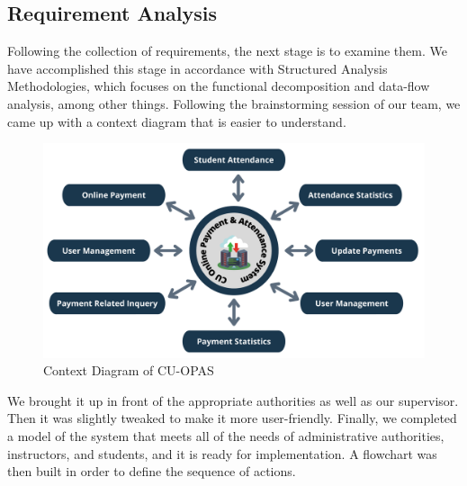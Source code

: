 \subsection{Requirement Analysis}\label{sub: reqana}
Following the collection of requirements, the next stage is to examine them. We have accomplished this stage in accordance with Structured Analysis Methodologies, which focuses on the functional decomposition and data-flow analysis, among other things. Following the brainstorming session of our team, we came up with a context diagram that is easier to understand.\\
\begin{figure}[H]
    \centering
    \includegraphics[width=1\textwidth]{images/context}
    \caption{Context Diagram of CU-OPAS}
    \label{fig:context}
\end{figure}
We brought it up in front of the appropriate authorities as well as our supervisor. Then it was slightly tweaked to make it more user-friendly. Finally, we completed a model of the system that meets all of the needs of administrative authorities, instructors, and students, and it is ready for implementation. A flowchart was then built in order to define the sequence of actions.\\

